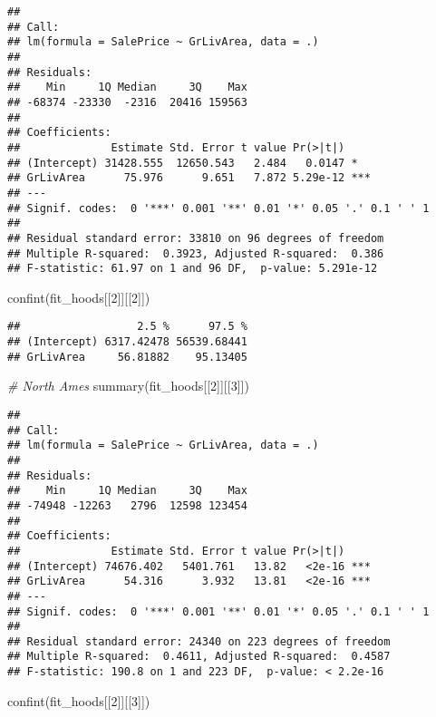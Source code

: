 \documentclass[
]{article}
\newenvironment{Shaded}{\begin{snugshade}}{\end{snugshade}}
\newcommand{\CommentTok}[1]{\textcolor[rgb]{0.56,0.35,0.01}{\textit{#1}}}
\newcommand{\DecValTok}[1]{\textcolor[rgb]{0.00,0.00,0.81}{#1}}
\newcommand{\FunctionTok}[1]{\textcolor[rgb]{0.00,0.00,0.00}{#1}}
\newcommand{\NormalTok}[1]{#1}
\begin{document}
\begin{verbatim}
## 
## Call:
## lm(formula = SalePrice ~ GrLivArea, data = .)
## 
## Residuals:
##    Min     1Q Median     3Q    Max 
## -68374 -23330  -2316  20416 159563 
## 
## Coefficients:
##              Estimate Std. Error t value Pr(>|t|)    
## (Intercept) 31428.555  12650.543   2.484   0.0147 *  
## GrLivArea      75.976      9.651   7.872 5.29e-12 ***
## ---
## Signif. codes:  0 '***' 0.001 '**' 0.01 '*' 0.05 '.' 0.1 ' ' 1
## 
## Residual standard error: 33810 on 96 degrees of freedom
## Multiple R-squared:  0.3923, Adjusted R-squared:  0.386 
## F-statistic: 61.97 on 1 and 96 DF,  p-value: 5.291e-12
\end{verbatim}

\begin{Shaded}
\begin{Highlighting}[]
\FunctionTok{confint}\NormalTok{(fit\_hoods[[}\DecValTok{2}\NormalTok{]][[}\DecValTok{2}\NormalTok{]])}
\end{Highlighting}
\end{Shaded}

\begin{verbatim}
##                  2.5 %      97.5 %
## (Intercept) 6317.42478 56539.68441
## GrLivArea     56.81882    95.13405
\end{verbatim}

\begin{Shaded}
\begin{Highlighting}[]
\CommentTok{\# North Ames}
\FunctionTok{summary}\NormalTok{(fit\_hoods[[}\DecValTok{2}\NormalTok{]][[}\DecValTok{3}\NormalTok{]])}
\end{Highlighting}
\end{Shaded}

\begin{verbatim}
## 
## Call:
## lm(formula = SalePrice ~ GrLivArea, data = .)
## 
## Residuals:
##    Min     1Q Median     3Q    Max 
## -74948 -12263   2796  12598 123454 
## 
## Coefficients:
##              Estimate Std. Error t value Pr(>|t|)    
## (Intercept) 74676.402   5401.761   13.82   <2e-16 ***
## GrLivArea      54.316      3.932   13.81   <2e-16 ***
## ---
## Signif. codes:  0 '***' 0.001 '**' 0.01 '*' 0.05 '.' 0.1 ' ' 1
## 
## Residual standard error: 24340 on 223 degrees of freedom
## Multiple R-squared:  0.4611, Adjusted R-squared:  0.4587 
## F-statistic: 190.8 on 1 and 223 DF,  p-value: < 2.2e-16
\end{verbatim}

\begin{Shaded}
\begin{Highlighting}[]
\FunctionTok{confint}\NormalTok{(fit\_hoods[[}\DecValTok{2}\NormalTok{]][[}\DecValTok{3}\NormalTok{]])}
\end{Highlighting}
\end{Shaded}
\end{document}
